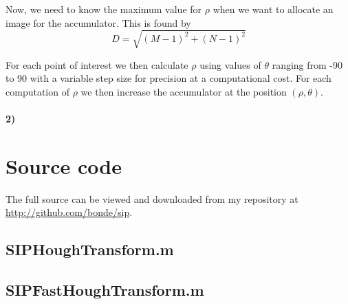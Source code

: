 \documentclass[a4paper, 10pt, final]{article}
\def\repository{\url{http://github.com/bonde/sip}}
\begin{document}
Now, we need to know the maximum value for $\rho$ when we want to
allocate an image for the accumulator. This is found by
\begin{equation}
    D = \sqrt{(M - 1)^2 + (N - 1)^2}
\end{equation}

For each point of interest we then calculate $\rho$ using values of
$\theta$ ranging from -90 to 90 with a variable step size for precision
at a computational cost. For each computation of $\rho$ we then
increase the accumulator at the position $(\rho, \theta)$.

\paragraph{2)}





\appendix
\lstset{language=Matlab, basicstyle=\scriptsize,
    showstringspaces=false, numbers=left, stepnumber=1,
    numberstyle=\tiny, frame=none}
\section{Source code}
The full source can be viewed and downloaded from my repository at
\repository{}.

\subsection{SIPHoughTransform.m}


\subsection{SIPFastHoughTransform.m}

\end{document}
